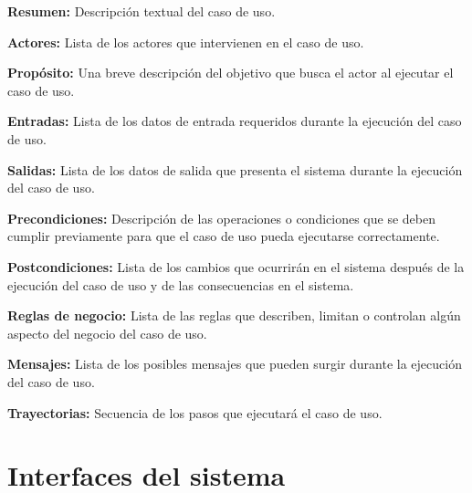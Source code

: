 \begin{objetivos}
	\item {\bf Resumen:} Descripción textual del caso de uso.
	\item {\bf Actores:} Lista de los actores que intervienen en el caso de uso.
	\item {\bf Propósito:} Una breve descripción del objetivo que busca el actor al ejecutar el caso de uso.
	\item {\bf Entradas:} Lista de los datos de entrada requeridos durante la ejecución del caso de uso.
	\item {\bf Salidas:} Lista de los datos de salida que presenta el sistema durante la ejecución del caso de uso.
	\item {\bf Precondiciones:} Descripción de las operaciones o condiciones que se deben cumplir previamente para que el caso de uso pueda ejecutarse correctamente.
	\item {\bf Postcondiciones:} Lista de los cambios que ocurrirán en el sistema después de la ejecución del caso de uso y de las consecuencias en el sistema.
	\item {\bf Reglas de negocio:} Lista de las reglas que describen, limitan o controlan algún aspecto del negocio del caso de uso.
	\item {\bf Mensajes:} Lista de los posibles mensajes que pueden surgir durante la ejecución del caso de uso.
	\item {\bf Trayectorias:} Secuencia de los pasos que ejecutará el caso de uso.
\end{objetivos}

%
\newpage
\chapter{Interfaces del sistema}
